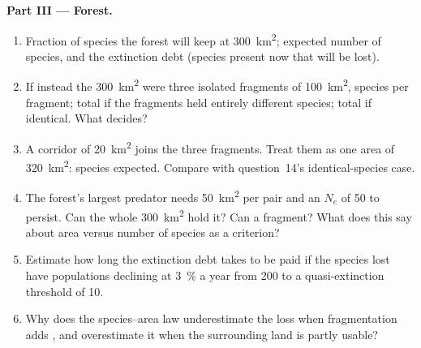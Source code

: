 \begin{problem}
\medskip
\noindent\textbf{Part III --- Forest.}
\begin{enumerate}[resume]
  \item Fraction of species the forest will keep at \qty{300}{km^2};
        expected number of species, and the extinction debt (species
        present now that will be lost).
  \item If instead the \qty{300}{km^2} were three isolated fragments of
        \qty{100}{km^2}, species per fragment; total if the fragments
        held entirely different species; total if identical. What
        decides?
  \item A corridor of \qty{20}{km^2} joins the three fragments. Treat
        them as one area of \qty{320}{km^2}: species expected. Compare
        with question~14's identical-species case.
  \item The forest's largest predator needs \qty{50}{km^2} per pair and
        an $N_{e}$ of 50 to persist. Can the whole \qty{300}{km^2} hold
        it? Can a fragment? What does this say about area versus number
        of species as a criterion?
  \item Estimate how long the extinction debt takes to be paid if the
        species lost have populations declining at \qty{3}{\%} a year
        from 200 to a quasi-extinction threshold of 10.
  \item Why does the species--area law underestimate the loss when
        fragmentation adds , and overestimate it when the
        surrounding land is partly usable?
\end{enumerate}


\end{problem}
